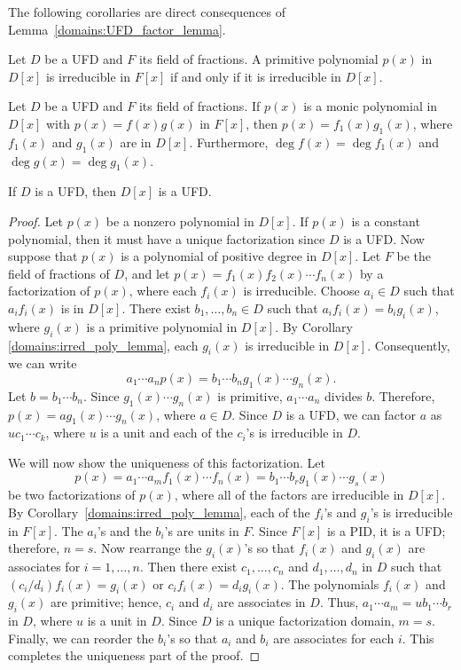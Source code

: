\medskip

The following corollaries are direct consequences of Lemma~\ref{domains:UFD_factor_lemma}. 

\begin{corollary}\label{domains:irred_poly_lemma}
Let $D$ be a UFD and $F$ its field of fractions.  A primitive
polynomial $p(x)$ in $D[x]$ is irreducible in $F[x]$ if and only if it
is irreducible in $D[x]$.
\end{corollary}

\begin{corollary}
Let $D$ be a UFD and $F$ its field of fractions.  If $p(x)$ is a monic
polynomial in $D[x]$ with $p(x) = f(x) g(x)$ in $F[x]$, then $p(x) =
f_1(x) g_1(x)$, where $f_1(x)$ and $g_1(x)$ are in $D[x]$. Furthermore,
$\deg f(x) = \deg f_1(x)$ and $\deg g(x) = \deg g_1(x)$.
\end{corollary}


\begin{theorem}
If $D$ is a UFD, then $D[x]$ is a UFD.
\end{theorem}
 
 
\begin{proof}
Let $p(x)$ be a nonzero polynomial in $D[x]$.  If $p(x)$ is a constant
polynomial, then it must have a unique factorization since $D$ is a
UFD. Now suppose that $p(x)$ is a polynomial of positive degree in
$D[x]$. Let $F$ be the field of fractions of $D$, and let $p(x) =
f_1(x) f_2(x) \cdots f_n(x)$ by a factorization of $p(x)$, where each
$f_i(x)$ is irreducible. Choose $a_i \in D$ such that $a_i f_i(x)$ is in
$D[x]$. There exist $b_1, \ldots, b_n \in D$ such that $a_i f_i(x) =
b_i g_i(x)$, where $g_i(x)$ is a primitive polynomial in $D[x]$. By 
Corollary \ref{domains:irred_poly_lemma}, each $g_i(x)$ is irreducible in $D[x]$. Consequently, 
we can write
\[
a_1 \cdots a_n p(x) = b_1 \cdots b_n g_1(x) \cdots g_n(x).
\]
Let $b = b_1 \cdots b_n$. Since $g_1(x) \cdots g_n(x)$ is primitive,
$a_1 \cdots a_n$ divides $b$. Therefore, $p(x) = a g_1(x) \cdots
g_n(x)$, where $a \in D$. Since $D$ is a UFD, we can factor $a$ as $u
c_1 \cdots c_k$, where $u$ is a unit and each of the $c_i$'s is
irreducible in $D$. 


We will now show the uniqueness of this factorization. Let
\[
p(x) = a_1 \cdots a_m f_1(x) \cdots f_n(x) = b_1 \cdots b_r g_1(x)
\cdots g_s(x)
\]
be two factorizations of $p(x)$, where all of the factors are
irreducible in $D[x]$.  By Corollary~\ref{domains:irred_poly_lemma}, each of the $f_i$'s and
$g_i$'s is irreducible in $F[x]$. The $a_i$'s and the $b_i$'s are
units in $F$. Since $F[x]$ is a PID, it is a UFD; therefore, $n=s$.
Now rearrange the $g_i(x)$'s so that $f_i(x)$ and $g_i(x)$ are
associates for $i = 1, \ldots, n$.  Then there exist $c_1, \ldots,
c_n$ and $d_1, \ldots, d_n$ in $D$ such that $(c_i / d_i) f_i(x) =
g_i(x)$ or $c_i f_i(x) = d_i g_i(x)$. The polynomials $f_i(x)$ and
$g_i(x)$ are primitive; hence, $c_i$ and $d_i$ are associates in $D$.
Thus, $a_1 \cdots a_m = u b_1 \cdots b_r$ in $D$, where $u$ is a unit
in $D$. Since $D$ is a unique factorization domain, $m =s$. Finally,
we can reorder the $b_i$'s so that $a_i$ and $b_i$ are associates for
each $i$. This completes the uniqueness part of the proof.   
\end{proof}


